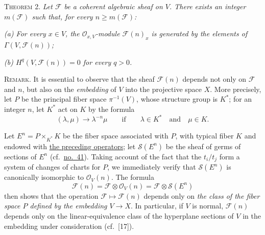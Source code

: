 \label{fac:III:3:no:66:theorem:2}
\textsc{Theorem 2.} \textit{Let $\mathcal{F}$ be a coherent algebraic sheaf
on $V$. There exists an integer $m(\mathcal{F})$ such that, for every
$n\geq m(\mathcal{F})$:}

\label{fac:III:3:no:66:theorem:2:item:a}
\textit{(a) For every $x\in V$, the $\mathcal{O}_{x,V}$-module
$\mathcal{F}(n)_x$ is generated by the elements of
$\Gamma(V,\mathcal{F}(n))$;}

\label{fac:III:3:no:66:theorem:2:item:b}
\textit{(b) $H^q(V,\mathcal{F}(n))=0$ for every $q>0$.}

\label{fac:III:3:no:66:remark}
\textsc{Remark.} It is essential to observe that the sheaf
$\mathcal{F}(n)$ depends not only on $\mathcal{F}$ and $n$, but also on the
\textit{embedding} of $V$ into the projective space $X$. More precisely,
let $P$ be the principal fiber space $\pi^{-1}(V)$, whose structure group
is $K^*$; for an integer $n$, let $K^*$ act on $K$ by the formula
\label{fac:III:3:no:66:formula:action}
\[
(\lambda,\mu)\longrightarrow\lambda^{-n}\mu
\qquad\text{if}\qquad
\lambda\in K^*\quad\text{and}\quad\mu\in K.
\]

\label{fac:III:3:no:66:construction:bundle}
Let $E^n=P\times_{K^*}K$ be the fiber space associated with $P$, with
typical fiber $K$ and endowed with
\hyperref[fac:III:3:no:66:formula:action]{the preceding operators}; let
$\mathcal{S}(E^n)$ be the sheaf of germs of sections of $E^n$
(cf.\ \hyperref[fac:II:2:no:41]{no.~41}). Taking account of the fact that
the $t_i/t_j$ form a system of changes of charts for $P$, we immediately
verify that $\mathcal{S}(E^n)$ is canonically isomorphic to
$\mathcal{O}_V(n)$. The formula
\label{fac:III:3:no:66:formula:twist-bundle}
\[
\mathcal{F}(n)=\mathcal{F}\otimes\mathcal{O}_V(n)
=\mathcal{F}\otimes\mathcal{S}(E^n)
\]
then shows that the operation $\mathcal{F}\longmapsto\mathcal{F}(n)$
depends only on \textit{the class of the fiber space $P$ defined by the
embedding $V\to X$}. In particular, if $V$ is normal, $\mathcal{F}(n)$
depends only on the linear-equivalence class of the hyperplane sections of
$V$ in the embedding under consideration (cf.~[17]).
